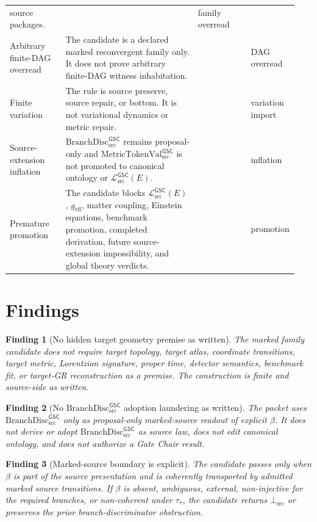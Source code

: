\documentclass[11pt]{article}
\newcommand{\MetricData}{\mathcal{L}_{\mathrm{src}}^{\mathsf{GSC}}}
\newcommand{\MetricTokenVal}{\mathrm{MetricTokenVal}_{\mathrm{src}}^{\mathsf{GSC}}}
\newcommand{\BottomSrc}{\bot_{\mathrm{src}}}
\newcommand{\geff}{g_{\mathrm{eff}}}
\newcommand{\BranchDisc}{\mathrm{BranchDisc}_{\mathrm{src}}^{\mathsf{GSC}}}
\newcommand{\Pass}{\mathrm{pass\_no\_smuggling\_detected}}
\newtheorem{finding}{Finding}
\begin{document}
\begin{longtable}{p{0.19\linewidth}p{0.45\linewidth}p{0.18\linewidth}p{0.12\linewidth}}
source packages. &
\Pass & family overread \\
Arbitrary finite-DAG overread &
The candidate is a declared marked reconvergent family only. It does not prove
arbitrary finite-DAG witness inhabitation. &
\Pass & DAG overread \\
Finite variation &
The rule is source preserve, source repair, or bottom. It is not variational
dynamics or metric repair. &
\Pass & variation import \\
Source-extension inflation &
\(\BranchDisc\) remains proposal-only and \(\MetricTokenVal\) is not promoted
to canonical ontology or \(\MetricData(E)\). &
\Pass & inflation \\
Premature promotion &
The candidate blocks \(\MetricData(E)\), \(\geff\), matter coupling, Einstein
equations, benchmark promotion, completed derivation, future source-extension
impossibility, and global theory verdicts. &
\Pass & promotion \\
\bottomrule
\end{longtable}

\section{Findings}

\begin{finding}[No hidden target geometry premise as written]
The marked family candidate does not require target topology, target atlas,
coordinate transitions, target metric, Lorentzian signature, proper time,
detector semantics, benchmark fit, or target-GR reconstruction as a premise.
The construction is finite and source-side as written.
\end{finding}

\begin{finding}[No \(\BranchDisc\) adoption laundering as written]
The packet uses \(\BranchDisc\) only as proposal-only marked-source readout of
explicit \(\beta\). It does not derive or adopt \(\BranchDisc\) as source law,
does not edit canonical ontology, and does not authorize a Gate Chair result.
\end{finding}

\begin{finding}[Marked-source boundary is explicit]
The candidate passes only when \(\beta\) is part of the source presentation
and is coherently transported by admitted marked source transitions. If
\(\beta\) is absent, ambiguous, external, non-injective for the required
branches, or non-coherent under \(\tau_\ast\), the candidate returns
\(\BottomSrc\) or preserves the prior branch-discriminator obstruction.
\end{finding}
\end{document}
